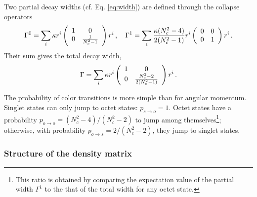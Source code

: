 \documentclass[times,sort&compress,final]{elsarticle}
\begin{document}
Two partial decay widths (cf. Eq. \eqref{eq:width}) are defined through the collapse operators
\begin{equation}
\Gamma^0=\sum_i \kappa r^i\left(\begin{array}{c c}
1 & 0\\
0 &\frac{1}{N_c^2-1}
\end{array}\right)r^i\,,\quad
\Gamma^1=\sum_i \frac{\kappa(N_c^2-4)}{2(N_c^2-1)}r^i\left(\begin{array}{c c}
0 & 0\\
0 & 1
\end{array}\right)r^i\,.
\end{equation}
Their sum gives the total decay width,
\begin{equation}
\Gamma=\sum_i \kappa r^i\left(\begin{array}{c c}
1 & 0\\
0 & \frac{N_c^2-2}{2(N_c^2-1)}\end{array}\right)r^i\,.
\end{equation}

The probability of color transitions is more simple than for angular momentum. 
Singlet states can only jump to octet states: $p_{s \to o}= 1$. 
Octet states have a probability $p_{o \to o}=(N_c^2-4)/(N_c^2-2)$ to jump among themselves\footnote{
This ratio is obtained by comparing the expectation value of the partial width 
$\Gamma^1$ to the that of the total width for any octet state.}; otherwise, with probability $p_{o\to s}=2/(N_c^2-2)$, they jump to singlet states.

\subsubsection{Structure of the density matrix}
\end{document}
